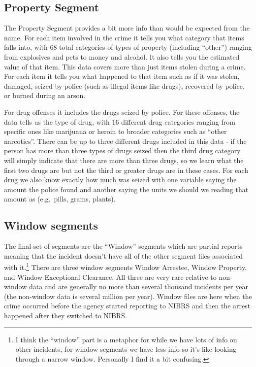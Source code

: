 \documentclass[
  12pt,
  openany]{book}
\begin{document}
\hypertarget{property-segment}{%
\subsection{Property Segment}\label{property-segment}}

The Property Segment provides a bit more info than would be expected from the name. For each item involved in the crime it tells you what category that items falls into, with 68 total categories of types of property (including ``other'') ranging from explosives and pets to money and alcohol. It also tells you the estimated value of that item. This data covers more than just items stolen during a crime. For each item it tells you what happened to that item such as if it was stolen, damaged, seized by police (such as illegal items like drugs), recovered by police, or burned during an arson.

For drug offenses it includes the drugs seized by police. For these offenses, the data tells us the type of drug, with 16 different drug categories ranging from specific ones like marijuana or heroin to broader categories such as ``other narcotics''. There can be up to three different drugs included in this data - if the person has more than three types of drugs seized then the third drug category will simply indicate that there are more than three drugs, so we learn what the first two drugs are but not the third or greater drugs are in these cases. For each drug we also know exactly how much was seized with one variable saying the amount the police found and another saying the units we should we reading that amount as (e.g.~pills, grams, plants).

\hypertarget{window}{%
\subsection{Window segments}\label{window}}

The final set of segments are the ``Window'' segments which are partial reports meaning that the incident doesn't have all of the other segment files associated with it.\footnote{I think the ``window'' part is a metaphor for while we have lots of info on other incidents, for window segments we have less info so it's like looking through a narrow window. Personally I find it a bit confusing.} There are three window segments Window Arrestee, Window Property, and Window Exceptional Clearance. All three are very rare relative to non-window data and are generally no more than several thousand incidents per year (the non-window data is several million per year). Window files are here when the crime occurred before the agency started reporting to NIBRS and then the arrest happened after they switched to NIBRS.
\end{document}
